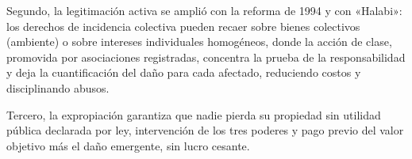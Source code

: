 \documentclass[12pt,oneside]{book}
\begin{document}
Segundo, la legitimación activa se amplió con la reforma de 1994 y con «Halabi»: los derechos de incidencia colectiva pueden recaer sobre bienes colectivos (ambiente) o sobre intereses individuales homogéneos, donde la acción de clase, promovida por asociaciones registradas, concentra la prueba de la responsabilidad y deja la cuantificación del daño para cada afectado, reduciendo costos y disciplinando abusos.

Tercero, la expropiación garantiza que nadie pierda su propiedad sin utilidad pública declarada por ley, intervención de los tres poderes y pago previo del valor objetivo más el daño emergente, sin lucro cesante.
\end{document}
